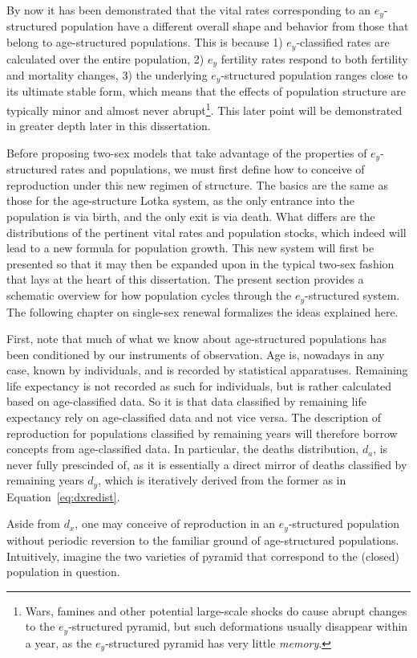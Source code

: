  \FloatBarrier
\label{sec:exstructuredrenewal}
By now it has been demonstrated that the vital rates corresponding to an
$e_y$-structured population have a different overall shape and behavior from
those that belong to age-structured populations. This is because 1) $e_y$-classified rates
are calculated over the entire population, 2) $e_y$ fertility rates respond to
both fertility and mortality changes, 3) the underlying $e_y$-structured
population ranges close to its ultimate stable form, which means that
the effects of population structure are typically minor and almost never
abrupt\footnote{Wars, famines and other potential large-scale shocks do cause
abrupt changes to the $e_y$-structured pyramid, but such deformations usually
disappear within a year, as the  $e_y$-structured pyramid has very little
\textit{memory}.}. This later point will be demonstrated in greater depth later
in this dissertation.

Before proposing two-sex models that take advantage of the properties of
$e_y$-structured rates and populations, we must first define how to conceive of
reproduction under this new regimen of structure. The basics are the
same as those for the age-structure Lotka system, as the only entrance into the
population is via birth, and the only exit is via death. What differs are the
distributions of the pertinent vital rates and population stocks, which indeed
will lead to a new formula for population growth. This new system will first be
presented so that it may then be expanded upon in the typical two-sex fashion
that lays at the heart of this dissertation. The present section provides a
schematic overview for how population cycles through the
$e_y$-structured system. The following chapter on single-sex renewal formalizes
the ideas explained here.

First, note that much of what we know about age-structured populations has been
conditioned by our instruments of observation. Age is, nowadays in any case,
known by individuals, and is recorded by statistical apparatuses. Remaining life
expectancy is not recorded as such for individuals, but is rather calculated
based on age-classified data. So it is that data classified by remaining
life expectancy rely on age-classified data and not vice versa. The description of 
reproduction for populations classified by remaining years will therefore
 borrow concepts from age-classified data. In particular, the deaths
distribution, $d_a$, is never fully prescinded of, as it is essentially a direct
mirror of deaths classified by remaining years $d_y$, which is
iteratively derived from the former as in Equation~\eqref{eq:dxredist}.

Aside from $d_x$, one may conceive of reproduction in an $e_y$-structured
population without periodic reversion to the familiar ground of age-structured
populations. Intuitively, imagine the two varieties of pyramid that correspond to the
(closed) population in question. 